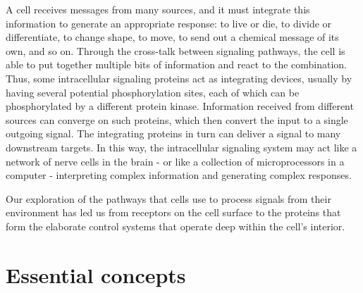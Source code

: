 A cell receives messages from many sources, and it must integrate this
information to generate an appropriate response: to live or die, to divide
or differentiate, to change shape, to move, to send out a chemical message
of its own, and so on. Through the cross-talk
between signaling pathways, the cell is able to put together multiple bits
of information and react to the combination. Thus, some intracellular
signaling proteins act as integrating devices, usually by having several
potential phosphorylation sites, each of which can be phosphorylated by
a different protein kinase. Information received from different sources
can converge on such proteins, which then convert the input to a single
outgoing signal. The integrating
proteins in turn can deliver a signal to many downstream targets. In this
way, the intracellular signaling system may act like a network of nerve
cells in the brain - or like a collection of microprocessors in a computer - 
interpreting complex information and generating complex responses.

Our exploration of the pathways that cells use to process signals from
their environment has led us from receptors on the cell surface to the
proteins that form the elaborate control systems that operate deep within
the cell’s interior.

\section{Essential concepts}

